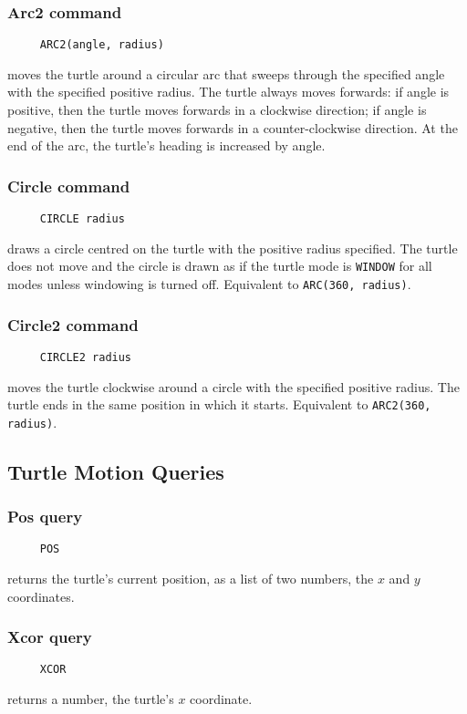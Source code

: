 \subsubsection*{Arc2 command}
\begin{verbatim}
     ARC2(angle, radius)
\end{verbatim}
moves the turtle around a circular arc that sweeps through the
specified angle with the specified positive radius.  The turtle always
moves forwards: if angle is positive, then the turtle moves forwards
in a clockwise direction; if angle is negative, then the turtle moves
forwards in a counter-clockwise direction.  At the end of the arc, the
turtle's heading is increased by angle.

\subsubsection*{Circle command}
\begin{verbatim}
     CIRCLE radius
\end{verbatim}
draws a circle centred on the turtle with the positive radius
specified.  The turtle does not move and the circle is drawn as if the
turtle mode is \texttt{WINDOW} for all modes unless windowing is
turned off.  Equivalent to \texttt{ARC(360, radius)}.

\subsubsection*{Circle2 command}
\begin{verbatim}
     CIRCLE2 radius
\end{verbatim}
moves the turtle clockwise around a circle with the specified positive
radius.  The turtle ends in the same position in which it starts.
Equivalent to \texttt{ARC2(360, radius)}.


\subsection{Turtle Motion Queries}

\subsubsection*{Pos query}
\begin{verbatim}
     POS
\end{verbatim}
returns the turtle's current position, as a list of two numbers, the
$x$ and $y$ coordinates.

\subsubsection*{Xcor query}
\begin{verbatim}
     XCOR
\end{verbatim}
returns a number, the turtle's $x$ coordinate.

